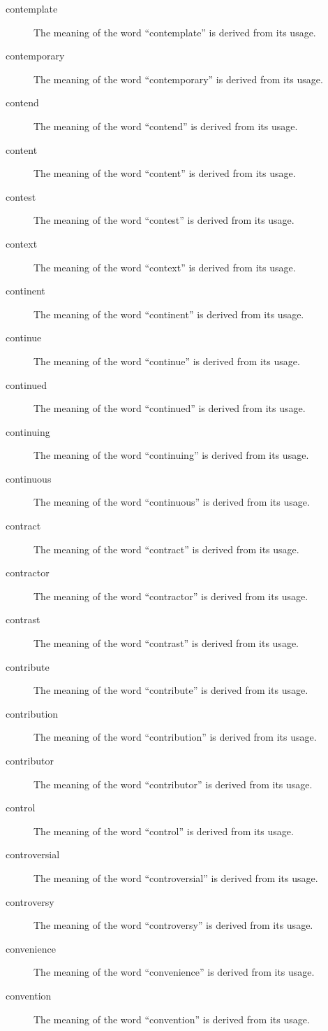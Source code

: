\documentclass[12pt, letterpaper]{memoir}
\begin{document}
\begin{description}
\item[contemplate] The meaning of the word ``contemplate'' is derived from its usage.
\item[contemporary] The meaning of the word ``contemporary'' is derived from its usage.
\item[contend] The meaning of the word ``contend'' is derived from its usage.
\item[content] The meaning of the word ``content'' is derived from its usage.
\item[contest] The meaning of the word ``contest'' is derived from its usage.
\item[context] The meaning of the word ``context'' is derived from its usage.
\item[continent] The meaning of the word ``continent'' is derived from its usage.
\item[continue] The meaning of the word ``continue'' is derived from its usage.
\item[continued] The meaning of the word ``continued'' is derived from its usage.
\item[continuing] The meaning of the word ``continuing'' is derived from its usage.
\item[continuous] The meaning of the word ``continuous'' is derived from its usage.
\item[contract] The meaning of the word ``contract'' is derived from its usage.
\item[contractor] The meaning of the word ``contractor'' is derived from its usage.
\item[contrast] The meaning of the word ``contrast'' is derived from its usage.
\item[contribute] The meaning of the word ``contribute'' is derived from its usage.
\item[contribution] The meaning of the word ``contribution'' is derived from its usage.
\item[contributor] The meaning of the word ``contributor'' is derived from its usage.
\item[control] The meaning of the word ``control'' is derived from its usage.
\item[controversial] The meaning of the word ``controversial'' is derived from its usage.
\item[controversy] The meaning of the word ``controversy'' is derived from its usage.
\item[convenience] The meaning of the word ``convenience'' is derived from its usage.
\item[convention] The meaning of the word ``convention'' is derived from its usage.

\end{description}
\end{document}
